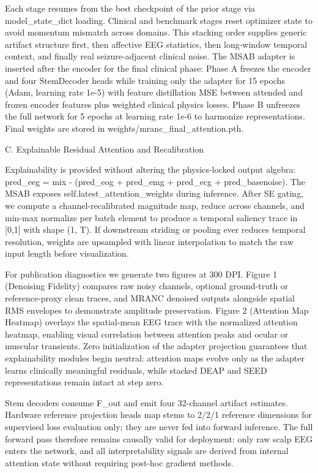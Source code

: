\documentclass[journal,twocolumn]{IEEEtran}
\begin{document}
Each stage resumes from the best checkpoint of the prior stage via model\_state\_dict loading. Clinical and benchmark stages reset optimizer state to avoid momentum mismatch across domains. This stacking order supplies generic artifact structure first, then affective EEG statistics, then long-window temporal context, and finally real seizure-adjacent clinical noise. The MSAB adapter is inserted after the encoder for the final clinical phase: Phase A freezes the encoder and four StemDecoder heads while training only the adapter for 15 epochs (Adam, learning rate 1e-5) with feature distillation MSE between attended and frozen encoder features plus weighted clinical physics losses. Phase B unfreezes the full network for 5 epochs at learning rate 1e-6 to harmonize representations. Final weights are stored in weights/mranc\_final\_attention.pth.

C. Explainable Residual Attention and Recalibration

Explainability is provided without altering the physics-locked output algebra: pred\_eeg = mix - (pred\_eog + pred\_emg + pred\_ecg + pred\_basenoise). The MSAB exposes self.latest\_attention\_weights during inference. After SE gating, we compute a channel-recalibrated magnitude map, reduce across channels, and min-max normalize per batch element to produce a temporal saliency trace in [0,1] with shape (1, T). If downstream striding or pooling ever reduces temporal resolution, weights are upsampled with linear interpolation to match the raw input length before visualization.

For publication diagnostics we generate two figures at 300 DPI. Figure 1 (Denoising Fidelity) compares raw noisy channels, optional ground-truth or reference-proxy clean traces, and MRANC denoised outputs alongside spatial RMS envelopes to demonstrate amplitude preservation. Figure 2 (Attention Map Heatmap) overlays the spatial-mean EEG trace with the normalized attention heatmap, enabling visual correlation between attention peaks and ocular or muscular transients. Zero initialization of the adapter projection guarantees that explainability modules begin neutral: attention maps evolve only as the adapter learns clinically meaningful residuals, while stacked DEAP and SEED representations remain intact at step zero.

Stem decoders consume F\_out and emit four 32-channel artifact estimates. Hardware reference projection heads map stems to 2/2/1 reference dimensions for supervised loss evaluation only; they are never fed into forward inference. The full forward pass therefore remains causally valid for deployment: only raw scalp EEG enters the network, and all interpretability signals are derived from internal attention state without requiring post-hoc gradient methods.
\end{document}
